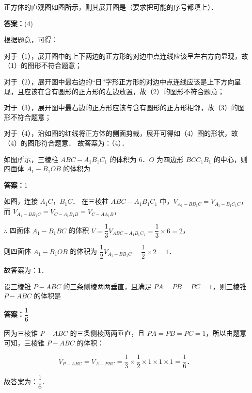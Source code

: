 \begin{example}[\bkstar{3}{5}]
正方体的直观图如图所示，则其展开图是（要求把可能的序号都填上）．
\end{example}
\begin{solution}
\textbf{答案：}(4)

根据题意，可得：

对于（1），展开图中的上下两边的正方形的对边中点连线应该呈左右方向显现，故（1）的图形不符合题意；

对于（2），展开图中最右边的“日”字形正方形的对边中点连线应该是上下方向呈现，且应该在含有圆形的正方形的左边放置，故（2）的图形不符合题意；

对于（3），展开图中最右边的正方形应该与含有圆形的正方形相邻，故（3）的图形不符合题意；

对于（4），沿如图的红线将正方体的侧面剪裁，展开可得如（4）图的形状，故（4）的图形符合题意．
故答案为：（4）．
\end{solution}

\vspace{2em}


\begin{example}[\bkstar{3}{5}]
如图所示，三棱柱 $ABC-A_1B_1C_1$ 的体积为 $6$．$O$ 为四边形 $BCC_1B_1$ 的中心，则四面体 $A_1-B_1OB$ 的体积为
\end{example}
\begin{solution}
\textbf{答案：}$1$

如图，连接 $A_1C$，$B_1C$．
在三棱柱 $ABC-A_1B_1C_1$ 中，$V_{A_1-BB_1C}=V_{A_1-B_1C_1C}$，而 $V_{A_1-BB_1C}=V_{C-A_1B_1B}=V_{C-AA_1B}$，

$\therefore$ 四面体 $A_1-B_1BC$ 的体积 $V=\dfrac{1}{3}V_{ABC-A_1B_1C_1}=\dfrac{1}{3}\times 6=2$，

则四面体 $A_1-B_1OB$ 的体积为 $\dfrac{1}{2}V_{A_1-BB_1C}=\dfrac{1}{2}\times 2=1$．

故答案为：$1$．
\end{solution}

\vspace{2em}

\begin{example}[\bkstar{2}{5}]
设三棱锥 $P-ABC$ 的三条侧棱两两垂直，且满足 $PA=PB=PC=1$，则三棱锥 $P-ABC$ 的体积是
\end{example}
\begin{solution}
\textbf{答案：}$\dfrac{1}{6}$

因为三棱锥 $P-ABC$ 的三条侧棱两两垂直，且 $PA=PB=PC=1$，所以由题意可知，三棱锥 $P-ABC$ 的体积：

$$
V_{P-ABC}=V_{A-PBC}=\dfrac{1}{3}\times\dfrac{1}{2}\times 1\times 1\times 1=\dfrac{1}{6}．
$$

故答案为：$\dfrac{1}{6}$．
\end{solution}

